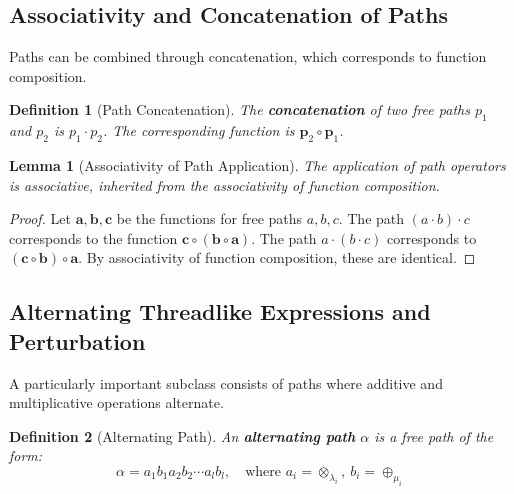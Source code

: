 \documentclass[12pt]{article}
\newtheorem{definition}{Definition}[section]
\newtheorem{lemma}{Lemma}[section]
\begin{document}
\subsection{Associativity and Concatenation of Paths}

Paths can be combined through concatenation, which corresponds to function composition.

\begin{definition}[Path Concatenation]\label{def:concatenate_cs}
The \textbf{concatenation} of two free paths \( p_1 \) and \( p_2 \) is \( p_1 \cdot p_2 \). The corresponding function is \( \mathbf{p}_2 \circ \mathbf{p}_1 \).
\end{definition}

\begin{lemma}[Associativity of Path Application]\label{lemma:associative_cs}
The application of path operators is associative, inherited from the associativity of function composition.
\end{lemma}
\begin{proof}
Let \( \mathbf{a}, \mathbf{b}, \mathbf{c} \) be the functions for free paths \( a, b, c \). The path \( (a \cdot b) \cdot c \) corresponds to the function \( \mathbf{c} \circ (\mathbf{b} \circ \mathbf{a}) \). The path \( a \cdot (b \cdot c) \) corresponds to \( (\mathbf{c} \circ \mathbf{b}) \circ \mathbf{a} \). By associativity of function composition, these are identical.
\end{proof}

\subsection{Alternating Threadlike Expressions and Perturbation}

A particularly important subclass consists of paths where additive and multiplicative operations alternate.

\begin{definition}[Alternating Path]\label{def:alternating_path_cs}
An \textbf{alternating path} \( \alpha \) is a free path of the form:
\begin{equation}\label{eq:alternative_cs}
    \alpha = a_1 b_1 a_2 b_2 \cdots a_l b_l, \quad \text{where } a_i = \otimes_{\lambda_i}, \ b_i = \oplus_{\mu_i}
\end{equation}
\end{definition}
\end{document}
